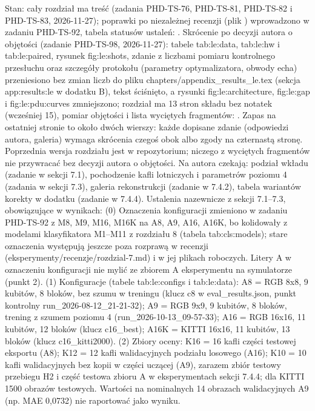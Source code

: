 {Stan: cały rozdział ma treść (zadania PHD-TS-76, PHD-TS-81, PHD-TS-82 i PHD-TS-83, 2026-11-27); poprawki po niezależnej recenzji (plik ) wprowadzono w zadaniu PHD-TS-92, tabela statusów ustaleń: .
Skrócenie po decyzji autora o objętości (zadanie PHD-TS-98, 2026-11-27): tabele tab:le:data, tab:le:hw i tab:le:paired, rysunek fig:le:shots, zdanie z liczbami pomiaru kontrolnego przesłuchu oraz szczegóły protokołu (parametry optymalizatora, obwody echa) przeniesiono bez zmian liczb do pliku chapters/appendix_results_le.tex (sekcja app:results:le w dodatku B), tekst ściśnięto, a rysunki fig:le:architecture, fig:le:gap i fig:le:pdu:curves zmniejszono; rozdział ma 13 stron składu bez notatek (wcześniej 15), pomiar objętości i lista wyciętych fragmentów: .
Zapas na ostatniej stronie to około dwóch wierszy: każde dopisane zdanie (odpowiedzi autora, galeria) wymaga skrócenia czegoś obok albo zgody na czternastą stronę.
Poprzednia wersja rozdziału jest w repozytorium; niczego z wyciętych fragmentów nie przywracać bez decyzji autora o objętości.
Na autora czekają: podział wkładu (zadanie w sekcji 7.1), pochodzenie kafli lotniczych i parametrów poziomu 4 (zadania w sekcji 7.3), galeria rekonstrukcji (zadanie w 7.4.2), tabela wariantów korekty w dodatku (zadanie w 7.4.4).
Ustalenia nazewnicze z sekcji 7.1--7.3, obowiązujące w wynikach:
(0) Oznaczenia konfiguracji zmieniono w zadaniu PHD-TS-92 z M8, M9, M16, M16K na A8, A9, A16, A16K, bo kolidowały z modelami klasyfikatora M1--M11 z rozdziału 8 (tabela tab:cls:models); stare oznaczenia występują jeszcze poza rozprawą w recenzji (eksperymenty/recenzje/rozdzial-7.md) i w jej plikach roboczych. Litery A w oznaczeniu konfiguracji nie mylić ze zbiorem A eksperymentu na symulatorze (punkt 2).
(1) Konfiguracje (tabele tab:le:configs i tab:le:data): A8 = RGB 8x8, 9 kubitów, 8 bloków, bez szumu w treningu (klucz c8 w eval_results.json, punkt kontrolny run_2026-08-12_21-21-32); A9 = RGB 9x9, 9 kubitów, 8 bloków, trening z szumem poziomu 4 (run_2026-10-13_09-57-33); A16 = RGB 16x16, 11 kubitów, 12 bloków (klucz c16_best); A16K = KITTI 16x16, 11 kubitów, 13 bloków (klucz c16_kitti2000).
(2) Zbiory oceny: K16 = 16 kafli części testowej eksportu (A8); K12 = 12 kafli walidacyjnych podziału losowego (A16); K10 = 10 kafli walidacyjnych bez kopii w części uczącej (A9), zarazem zbiór testowy przebiegu H2 i część testowa zbioru A w eksperymentach sekcji 7.4.4; dla KITTI 1500 obrazów testowych. Wartości na nominalnych 14 obrazach walidacyjnych A9 (np. MAE 0,0732) nie raportować jako wyniku.
}
